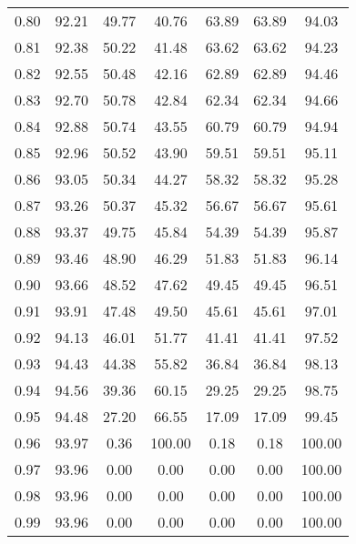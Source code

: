 \begin{tabular}{|c|c|c|c|c|c|c|}
      0.80 &     92.21 &     49.77 &      40.76 &   63.89 &      63.89 &         94.03 \\
      0.81 &     92.38 &     50.22 &      41.48 &   63.62 &      63.62 &         94.23 \\
      0.82 &     92.55 &     50.48 &      42.16 &   62.89 &      62.89 &         94.46 \\
      0.83 &     92.70 &     50.78 &      42.84 &   62.34 &      62.34 &         94.66 \\
      0.84 &     92.88 &     50.74 &      43.55 &   60.79 &      60.79 &         94.94 \\
      0.85 &     92.96 &     50.52 &      43.90 &   59.51 &      59.51 &         95.11 \\
      0.86 &     93.05 &     50.34 &      44.27 &   58.32 &      58.32 &         95.28 \\
      0.87 &     93.26 &     50.37 &      45.32 &   56.67 &      56.67 &         95.61 \\
      0.88 &     93.37 &     49.75 &      45.84 &   54.39 &      54.39 &         95.87 \\
      0.89 &     93.46 &     48.90 &      46.29 &   51.83 &      51.83 &         96.14 \\
      0.90 &     93.66 &     48.52 &      47.62 &   49.45 &      49.45 &         96.51 \\
      0.91 &     93.91 &     47.48 &      49.50 &   45.61 &      45.61 &         97.01 \\
      0.92 &     94.13 &     46.01 &      51.77 &   41.41 &      41.41 &         97.52 \\
      0.93 &     94.43 &     44.38 &      55.82 &   36.84 &      36.84 &         98.13 \\
      0.94 &     94.56 &     39.36 &      60.15 &   29.25 &      29.25 &         98.75 \\
      0.95 &     94.48 &     27.20 &      66.55 &   17.09 &      17.09 &         99.45 \\
      0.96 &     93.97 &      0.36 &     100.00 &    0.18 &       0.18 &        100.00 \\
      0.97 &     93.96 &      0.00 &       0.00 &    0.00 &       0.00 &        100.00 \\
      0.98 &     93.96 &      0.00 &       0.00 &    0.00 &       0.00 &        100.00 \\
      0.99 &     93.96 &      0.00 &       0.00 &    0.00 &       0.00 &        100.00 \\
\bottomrule
\end{tabular}
